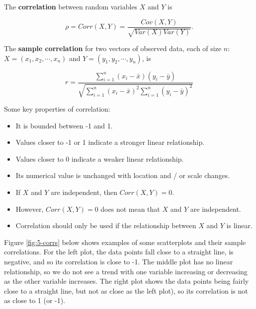 \documentclass[
]{book}
\providecommand{\tightlist}{%
  \setlength{\itemsep}{0pt}\setlength{\parskip}{0pt}}
\begin{document}
The \textbf{correlation} between random variables \(X\) and \(Y\) is

\begin{equation} 
\rho = Corr(X,Y) = \frac{Cov(X,Y)}{\sqrt{Var(X) Var(Y)}}.
\label{eq:5-corr}
\end{equation}

The \textbf{sample correlation} for two vectors of observed data, each of size \(n\): \(X = (x_1, x_2, \cdots, x_n)\) and \(Y = (y_1, y_2, \cdots, y_n)\), is

\begin{equation} 
r = \frac{\sum_{i=1}^n (x_i - \bar{x})(y_i - \bar{y})}{\sqrt{\sum_{i=1}^n (x_i - \bar{x})^2 \sum_{i=1}^n (y_i - \bar{y})^2}}
\label{eq:5-sampcorr}
\end{equation}

Some key properties of correlation:

\begin{itemize}
\tightlist
\item
  It is bounded between -1 and 1.
\item
  Values closer to -1 or 1 indicate a stronger linear relationship.
\item
  Values closer to 0 indicate a weaker linear relationship.
\item
  Its numerical value is unchanged with location and / or scale changes.
\item
  If \(X\) and \(Y\) are independent, then \(Corr(X,Y) = 0\).
\item
  However, \(Corr(X,Y) = 0\) does not mean that \(X\) and \(Y\) are independent.
\item
  Correlation should only be used if the relationship between \(X\) and \(Y\) is linear.
\end{itemize}

Figure \ref{fig:5-corrs} below shows examples of some scatterplots and their sample correlations. For the left plot, the data points fall close to a straight line, is negative, and so its correlation is close to -1. The middle plot has no linear relationship, so we do not see a trend with one variable increasing or decreasing as the other variable increases. The right plot shows the data points being fairly close to a straight line, but not as close as the left plot), so its correlation is not as close to 1 (or -1).
\end{document}
